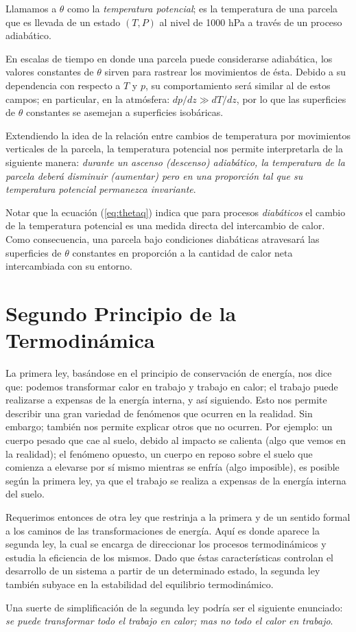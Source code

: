 \documentclass[openany]{book}
\begin{document}
\par Llamamos a $\theta$ como la \emph{temperatura potencial}; es la temperatura de una parcela que es llevada de un estado $(T,P)$ al nivel de 1000 hPa a través de un proceso adiabático.
\par En escalas de tiempo en donde una parcela puede considerarse adiabática, los valores constantes de $\theta$ sirven para rastrear los movimientos de ésta. Debido a su dependencia con respecto a $T$ y $p$, su comportamiento será similar al de estos campos; en particular, en la atmósfera: $dp/dz\gg dT/dz$, por lo que las superficies de $\theta$ constantes se asemejan a superficies isobáricas.
\par Extendiendo la idea de la relación entre cambios de temperatura por movimientos verticales de la parcela, la temperatura potencial nos permite interpretarla de la siguiente manera: {\sl durante un ascenso (descenso) adiabático, la temperatura de la parcela deberá disminuir (aumentar) pero en una proporción tal que su temperatura potencial permanezca invariante}.
\par Notar que la ecuación (\ref{eq:thetaq}) indica que para procesos \emph{diabáticos} el cambio de la temperatura potencial es una medida directa del intercambio de calor. Como consecuencia, una parcela bajo condiciones diabáticas atravesará las superficies de $\theta$ constantes en proporción a la cantidad de calor neta intercambiada con su entorno.

\chapter{Segundo Principio de la Termodinámica}
La primera ley, basándose en el principio de conservación de energía, nos dice que: podemos transformar calor en trabajo y trabajo en calor; el trabajo puede realizarse a expensas de la energía interna, y así siguiendo. Esto nos permite describir una gran variedad de fenómenos que ocurren en la realidad. Sin embargo; también nos permite explicar otros que no ocurren. Por ejemplo: un cuerpo pesado que cae al suelo, debido al impacto se calienta (algo que vemos en la realidad); el fenómeno opuesto, un cuerpo en reposo sobre el suelo que comienza a elevarse por sí mismo mientras se enfría (algo imposible), es posible según la primera ley, ya que el trabajo se realiza a expensas de la energía interna del suelo.
\par Requerimos entonces de otra ley que restrinja a la primera y de un sentido formal a los caminos de las transformaciones de energía. Aquí es donde aparece la segunda ley, la cual se encarga de direccionar los procesos termodinámicos y estudia la eficiencia de los mismos. Dado que éstas características controlan el desarrollo de un sistema a partir de un determinado estado, la segunda ley también subyace en la estabilidad del equilibrio termodinámico.
\par Una suerte de simplificación de la segunda ley podría ser el siguiente enunciado: {\sl se puede transformar todo el trabajo en calor; mas no todo el calor en trabajo}.
\end{document}
